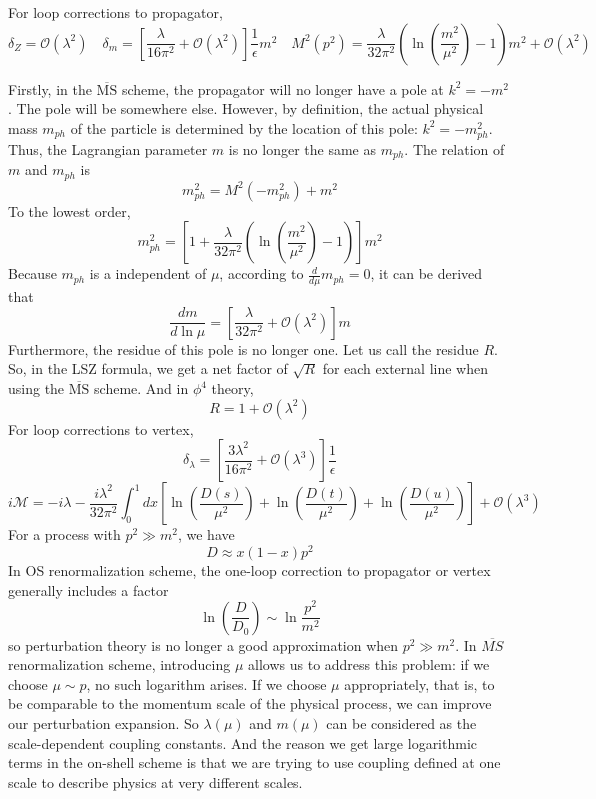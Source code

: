 For loop corrections to propagator,
\[\delta_Z=\mathcal{O}(\lambda^2) \quad \delta_m = \left[ \frac{\lambda}{16\pi^2} + \mathcal{O}(\lambda^2) \right]\frac{1}{\epsilon}m^2 \quad M^2(p^2) = \frac{\lambda}{32\pi^2}( \ln(\frac{m^2}{\mu^2})-1)m^2 + \mathcal{O}(\lambda^2)\]

Firstly, in the $\mathrm{\overline{MS}}$ scheme, the propagator will no longer have a pole at $k^2=-m^2$. The pole will be somewhere else. However, by definition, the actual physical mass $m_{ph}$ of the particle is determined by the location of this pole: $k^2 = -m_{ph}^2$. Thus, the Lagrangian parameter $m$ is no longer the same as $m_{ph}$. The relation of $m$ and $m_{ph}$ is 
\[m_{ph}^2 = M^2(-m_{ph}^2) + m^2\]
To the lowest order, 
\[m_{ph}^2 = \left[1+\frac{\lambda}{32\pi^2}( \ln(\frac{m^2}{\mu^2})-1)\right] m^2\]
Because $m_{ph}$ is a independent of $\mu$, according to $\frac{d}{d\mu} m_{ph} = 0$, it can be derived that
\[\frac{dm}{d\ln \mu} = \left[\frac{\lambda}{32\pi^2}+\mathcal{O}(\lambda^2)\right] m\]
Furthermore, the residue of this pole is no longer one. Let us call the residue $R$. So, in the LSZ formula, we get a net factor of $\sqrt{R}$ for each external line when using the $\mathrm{\overline{MS}}$ scheme. And in $\phi^4$ theory,
\[R = 1 + \mathcal{O}(\lambda^2)\]
For loop corrections to vertex,
\[\delta_{\lambda} = \left[\frac{3\lambda^2}{16\pi^2} + \mathcal{O}(\lambda^3)\right]\frac{1}{\epsilon}\]
\[i\mathcal{M} = -i\lambda -\frac{i\lambda^2}{32\pi^2} \int_0^1 dx \left[\ln(\frac{D(s)}{\mu^2}) +\ln(\frac{D(t)}{\mu^2})+\ln(\frac{D(u)}{\mu^2})\right] + \mathcal{O}(\lambda^3)\]
For a process with $p^2 \gg m^2$, we have
\[ D \approx x(1-x)p^2\]
In OS renormalization scheme, the one-loop correction to propagator or vertex generally includes a factor
\[\ln \left( \frac{D}{D_0}\right ) \sim \ln \frac{p^2}{m^2}\]
so perturbation theory is no longer a good approximation when $p^2 \gg m^2$.
In $\overline{MS}$ renormalization scheme, introducing $\mu$ allows us to address this problem: if we choose $\mu \sim p$, no such logarithm arises. If we choose $\mu$ appropriately, that is, to be comparable to the momentum scale of the physical process, we can
improve our perturbation expansion. 
So $\lambda(\mu)$ and $m(\mu)$ can be considered as the scale-dependent coupling constants.
And the reason we get large logarithmic terms in the on-shell scheme is that we are trying to use coupling defined at one scale to describe physics at very different scales.

